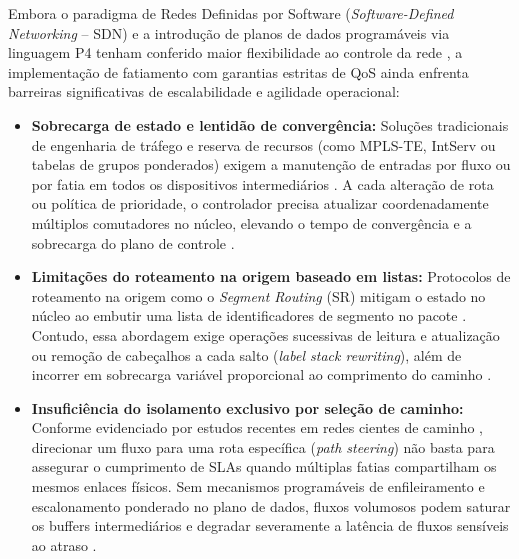 Embora o paradigma de Redes Definidas por Software (\textit{Software-Defined Networking} -- SDN) e a introdução de planos de dados programáveis via linguagem P4 tenham conferido maior flexibilidade ao controle da rede \cite{KAUR2021109}, a implementação de fatiamento com garantias estritas de QoS ainda enfrenta barreiras significativas de escalabilidade e agilidade operacional:

\begin{itemize}
    \item \textbf{Sobrecarga de estado e lentidão de convergência:} Soluções tradicionais de engenharia de tráfego e reserva de recursos (como MPLS-TE, IntServ ou tabelas de grupos ponderados) exigem a manutenção de entradas por fluxo ou por fatia em todos os dispositivos intermediários \cite{wei2026panqosr, santos2024mtspolka}. A cada alteração de rota ou política de prioridade, o controlador precisa atualizar coordenadamente múltiplos comutadores no núcleo, elevando o tempo de convergência e a sobrecarga do plano de controle \cite{liberato2018rdna, froes2020proglab}.
    \item \textbf{Limitações do roteamento na origem baseado em listas:} Protocolos de roteamento na origem como o \textit{Segment Routing} (SR) mitigam o estado no núcleo ao embutir uma lista de identificadores de segmento no pacote \cite{rfc8402, ventre2020segment}. Contudo, essa abordagem exige operações sucessivas de leitura e atualização ou remoção de cabeçalhos a cada salto (\textit{label stack rewriting}), além de incorrer em sobrecarga variável proporcional ao comprimento do caminho \cite{dominicini2020, borges2024pot}.
    \item \textbf{Insuficiência do isolamento exclusivo por seleção de caminho:} Conforme evidenciado por estudos recentes em redes cientes de caminho \cite{wei2026panqosr, puttaswamy2025pathaware}, direcionar um fluxo para uma rota específica (\textit{path steering}) não basta para assegurar o cumprimento de SLAs quando múltiplas fatias compartilham os mesmos enlaces físicos. Sem mecanismos programáveis de enfileiramento e escalonamento ponderado no plano de dados, fluxos volumosos podem saturar os buffers intermediários e degradar severamente a latência de fluxos sensíveis ao atraso \cite{santos2024mtspolka, Elbediwy2025}.
\end{itemize}

